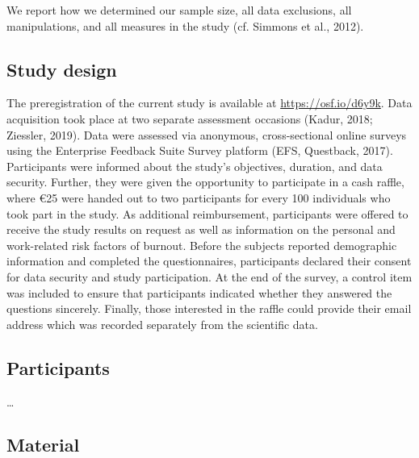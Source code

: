 \documentclass[
  man]{apa6}
\begin{document}
We report how we determined our sample size, all data exclusions, all manipulations, and all measures in the study (cf. Simmons et al., 2012).

\subsection{Study design}\label{study-design}

The preregistration of the current study is available at \url{https://osf.io/d6y9k}.
Data acquisition took place at two separate assessment occasions (Kadur, 2018; Ziessler, 2019).
Data were assessed via anonymous, cross-sectional online surveys using the Enterprise Feedback Suite Survey platform (EFS, Questback, 2017).
Participants were informed about the study's objectives, duration, and data security.
Further, they were given the opportunity to participate in a cash raffle, where €25 were handed out to two participants for every 100 individuals who took part in the study.
As additional reimbursement, participants were offered to receive the study results on request as well as information on the personal and work-related risk factors of burnout.
Before the subjects reported demographic information and completed the questionnaires, participants declared their consent for data security and study participation.
At the end of the survey, a control item was included to ensure that participants indicated whether they answered the questions sincerely.
Finally, those interested in the raffle could provide their email address which was recorded separately from the scientific data.

\subsection{Participants}\label{participants}

\ldots{}

\subsection{Material}\label{material}
\end{document}
